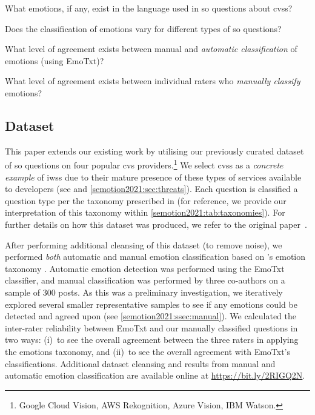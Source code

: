\def\SEMRQOne{What emotions, if any, exist in the language used in \gls{so} questions about \glspl{cvs}?}
\def\SEMRQTwo{Does the classification of emotions vary for different types of \gls{so} questions?}
\def\SEMRQThree{What level of agreement exists between manual and \textit{automatic classification} of emotions (using EmoTxt)?}
\def\SEMRQFour{What level of agreement exists between individual raters who \textit{manually classify} emotions?}
\begin{enumerate}[label=\textbf{[RQ\arabic*]}, leftmargin=2\parindent]
    \item \SEMRQOne{}
    \item \SEMRQTwo{}
    \item \SEMRQThree{}
    \item \SEMRQFour{}
\end{enumerate}

\subsection{Dataset}

This paper extends our existing work by utilising our previously curated dataset of \SEMNumTotalPostsFromSO{} \gls{so} questions on four popular \gls{cvs} providers.\footnote{\label{semotion2021:ftne:list-of-services}Google Cloud Vision, AWS Rekognition, Azure Vision, IBM Watson.} We select \glspl{cvs} as a \textit{concrete example} of \glspl{iws} due to their mature presence of these types of services available to developers (see \citep{Cummaudo:2020icse} and \cref{semotion2021:sec:threats}). Each question is classified a question type per the taxonomy prescribed in \citet{Beyer:2018fm} (for reference, we provide our interpretation of this taxonomy within \cref{semotion2021:tab:taxonomies}). For further details on how this dataset was produced, we refer to the original paper~\citep{Cummaudo:2020icse}.

After performing additional cleansing of this dataset (to remove noise), we performed \textit{both} automatic and manual emotion classification based on \citeauthor{shaver1987}'s emotion taxonomy \citep{shaver1987}. Automatic emotion detection was performed using the EmoTxt classifier, and manual classification was performed by three co-authors on a sample of 300 posts. As this was a preliminary investigation, we iteratively explored several smaller representative samples to see if any emotions could be detected and agreed upon (see \cref{semotion2021:ssec:manual}). We calculated the inter-rater reliability between EmoTxt and our manually classified questions in two ways: (i)~to see the overall agreement between the three raters in applying the \citeauthor{shaver1987} emotions taxonomy, and (ii)~to see the overall agreement with EmoTxt's classifications. Additional dataset cleansing and results from manual and automatic emotion classification are available online at \url{https://bit.ly/2RIGQ2N}.

